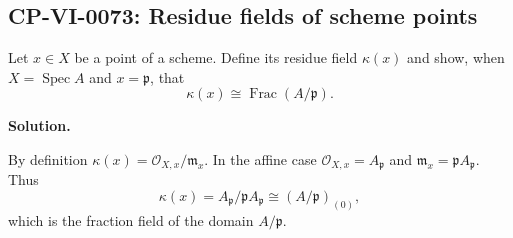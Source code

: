 
\subsection*{CP-VI-0073: Residue fields of scheme points}

Let $x\in X$ be a point of a scheme. Define its residue field $\kappa(x)$ and show, when $X=\operatorname{Spec}A$ and $x=\mathfrak p$, that
\[
\kappa(x)\cong\operatorname{Frac}(A/\mathfrak p).
\]

\medskip
\noindent\textbf{Solution.}

By definition $\kappa(x)=\mathcal O_{X,x}/\mathfrak m_x$. In the affine case $\mathcal O_{X,x}=A_{\mathfrak p}$ and $\mathfrak m_x=\mathfrak pA_{\mathfrak p}$. Thus
\[
\kappa(x)=A_{\mathfrak p}/\mathfrak pA_{\mathfrak p}\cong(A/\mathfrak p)_{(0)},
\]
which is the fraction field of the domain $A/\mathfrak p$.
